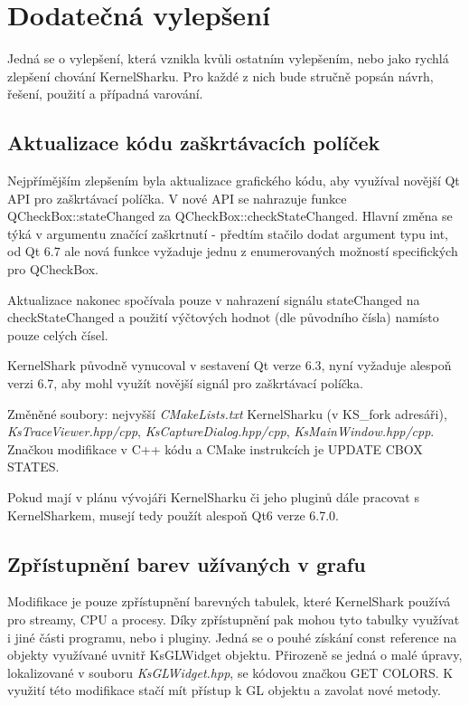 \chapter{Dodatečná vylepšení}

Jedná se o vylepšení, která vznikla kvůli ostatním vylepšením, nebo jako rychlá zlepšení chování KernelSharku. Pro každé z nich bude stručně popsán návrh, řešení, použití a případná varování.

\section{Aktualizace kódu zaškrtávacích políček}

Nejpřímějším zlepšením byla aktualizace grafického kódu, aby využíval novější Qt API pro zaškrtávací políčka. V nové API se nahrazuje funkce QCheckBox::stateChanged za QCheckBox::checkStateChanged. Hlavní změna se týká v argumentu značící zaškrtnutí - předtím stačilo dodat argument typu int, od Qt 6.7 ale nová funkce vyžaduje jednu z enumerovaných možností specifických pro QCheckBox.

Aktualizace nakonec spočívala pouze v nahrazení signálu stateChanged na checkStateChanged a použití výčtových hodnot (dle původního čísla) namísto pouze celých čísel.

KernelShark původně vynucoval v sestavení Qt verze 6.3, nyní vyžaduje alespoň verzi 6.7, aby mohl využít novější signál pro zaškrtávací políčka.

Změněné soubory: nejvyšší \emph{CMakeLists.txt} KernelSharku (v KS\_fork adresáři), \emph{KsTraceViewer.hpp/cpp}, \emph{KsCaptureDialog.hpp/cpp}, \emph{KsMainWindow.hpp/cpp}. Značkou modifikace v C++ kódu a CMake instrukcích je UPDATE CBOX STATES.

Pokud mají v plánu vývojáři KernelSharku či jeho pluginů dále pracovat s KernelSharkem, musejí tedy použít alespoň Qt6 verze 6.7.0.

\section{Zpřístupnění barev užívaných v grafu}

Modifikace je pouze zpřístupnění barevných tabulek, které KernelShark používá pro streamy, CPU a procesy. Díky zpřístupnění pak mohou tyto tabulky využívat i jiné části programu, nebo i pluginy. Jedná se o pouhé získání const reference na objekty využívané uvnitř KsGLWidget objektu. Přirozeně se jedná o malé úpravy, lokalizované v souboru \emph{KsGLWidget.hpp}, se kódovou značkou GET COLORS. K využití této modifikace stačí mít přístup k GL objektu a zavolat nové metody.


